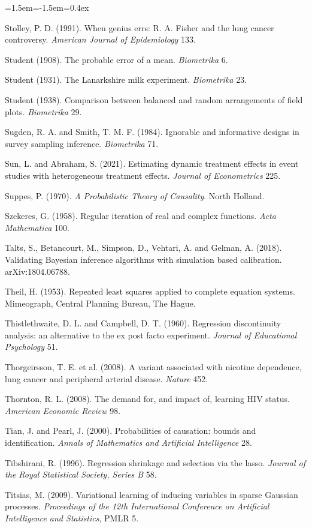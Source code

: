 \begin{list}{}{\leftmargin=1.5em\itemindent=-1.5em\itemsep=0.4ex}
\item Stolley, P. D. (1991). When genius errs: R. A. Fisher and the lung cancer controversy. \emph{American Journal of Epidemiology} 133.
\item Student (1908). The probable error of a mean. \emph{Biometrika} 6.
\item Student (1931). The Lanarkshire milk experiment. \emph{Biometrika} 23.
\item Student (1938). Comparison between balanced and random arrangements of field plots. \emph{Biometrika} 29.
\item Sugden, R. A. and Smith, T. M. F. (1984). Ignorable and informative designs in survey sampling inference. \emph{Biometrika} 71.
\item Sun, L. and Abraham, S. (2021). Estimating dynamic treatment effects in event studies with heterogeneous treatment effects. \emph{Journal of Econometrics} 225.
\item Suppes, P. (1970). \emph{A Probabilistic Theory of Causality}. North Holland.
\item Szekeres, G. (1958). Regular iteration of real and complex functions. \emph{Acta Mathematica} 100.
\item Talts, S., Betancourt, M., Simpson, D., Vehtari, A. and Gelman, A. (2018). Validating Bayesian inference algorithms with simulation based calibration. arXiv:1804.06788.
\item Theil, H. (1953). Repeated least squares applied to complete equation systems. Mimeograph, Central Planning Bureau, The Hague.
\item Thistlethwaite, D. L. and Campbell, D. T. (1960). Regression discontinuity analysis: an alternative to the ex post facto experiment. \emph{Journal of Educational Psychology} 51.
\item Thorgeirsson, T. E. et al. (2008). A variant associated with nicotine dependence, lung cancer and peripheral arterial disease. \emph{Nature} 452.
\item Thornton, R. L. (2008). The demand for, and impact of, learning HIV status. \emph{American Economic Review} 98.
\item Tian, J. and Pearl, J. (2000). Probabilities of causation: bounds and identification. \emph{Annals of Mathematics and Artificial Intelligence} 28.
\item Tibshirani, R. (1996). Regression shrinkage and selection via the lasso. \emph{Journal of the Royal Statistical Society, Series B} 58.
\item Titsias, M. (2009). Variational learning of inducing variables in sparse Gaussian processes. \emph{Proceedings of the 12th International Conference on Artificial Intelligence and Statistics}, PMLR 5.

\end{list}
